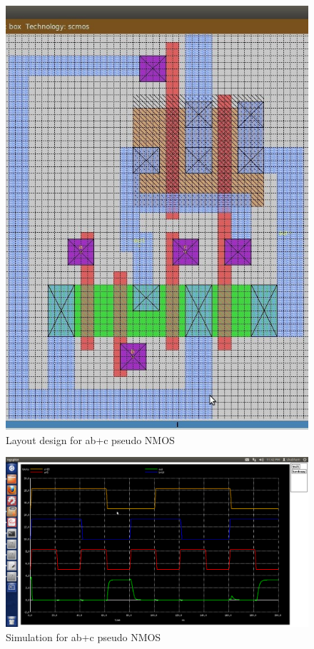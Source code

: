 \documentclass[12pt,a4paper]{article}
\begin{document}
\begin{center}
\vspace{10pt}
\begin{figure}[h]
\centering
\includegraphics[scale=.345]{ab+c_pseudo.jpg}
\caption[Short]{Layout design for ab+c pseudo NMOS}
\end{figure}

\clearpage

\vspace{10pt}
\begin{figure}[h]
\centering
\includegraphics[scale=.345]{ab_csm.png}
\caption[Short]{Simulation  for ab+c pseudo NMOS }
\end{figure}


\end{center}
\end{document}
